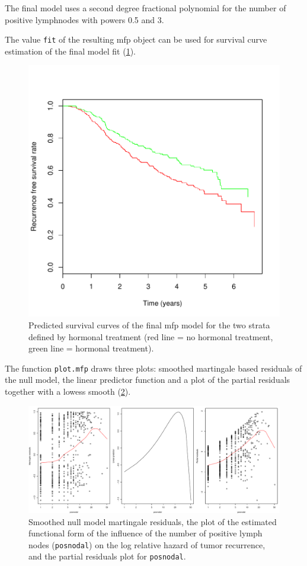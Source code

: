 \documentclass[11pt]{article}
\begin{document}
The final model uses a second degree fractional polynomial for the number of positive lymphnodes with powers 0.5 and 3. 

The value {\tt fit} of the resulting mfp object can be used  for survival curve estimation of the final model fit  (\ref{fig1}).

\begin{figure}[H]
\includegraphics{mfp-FIG1}
\caption{\label{fig1} Predicted survival curves of the final mfp model for the two strata defined by hormonal treatment (red line = no hormonal treatment, green line = hormonal treatment).}
\end{figure}

The function \texttt{plot.mfp} draws three plots: 
smoothed martingale based residuals of the null model, the linear predictor function and a plot of the partial residuals together with a lowess smooth (\ref{fig2}).

\begin{figure}[htb]
\includegraphics{mfp-FIG2}
\caption{\label{fig2} Smoothed null model martingale residuals, the plot of the estimated 
functional form of the influence of the number of positive lymph nodes ({\tt posnodal}) on the log relative hazard of tumor recurrence, 
and the partial residuals plot for {\tt posnodal}.}
\end{figure}




\end{document}
